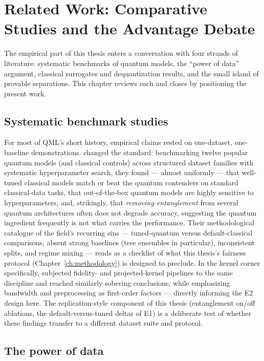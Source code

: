 \chapter{Related Work: Comparative Studies and the Advantage Debate}
\label{ch:related}

The empirical part of this thesis enters a conversation with four strands of
literature: systematic benchmarks of quantum models, the ``power of data''
argument, classical surrogates and dequantization results, and the small
island of provable separations. This chapter reviews each and closes by
positioning the present work.

\section{Systematic benchmark studies}
\label{sec:related-benchmarks}

For most of QML's short history, empirical claims rested on one-dataset,
one-baseline demonstrations. \citet{bowles2024better} changed the standard:
benchmarking twelve popular quantum models (and classical controls) across
structured dataset families with systematic hyperparameter search, they found
--- almost uniformly --- that well-tuned classical models match or beat the
quantum contenders on standard classical-data tasks, that out-of-the-box
quantum models are highly sensitive to hyperparameters, and, strikingly, that
\emph{removing entanglement} from several quantum architectures often does not
degrade accuracy, suggesting the quantum ingredient frequently is not what
carries the performance. Their methodological catalogue of the field's
recurring sins --- tuned-quantum versus default-classical comparisons, absent
strong baselines (tree ensembles in particular), inconsistent splits, and
regime mixing --- reads as a checklist of what this thesis's fairness protocol
(Chapter~\ref{ch:methodology}) is designed to preclude. In the kernel corner
specifically, \citet{schnabel2025scrutiny} subjected fidelity- and
projected-kernel pipelines to the same discipline and reached similarly
sobering conclusions, while emphasizing bandwidth and preprocessing as
first-order factors --- directly informing the E2 design here. The
replication-style component of this thesis (entanglement on/off ablations, the
default-versus-tuned deltas of E1) is a deliberate test of whether these
findings transfer to a different dataset suite and protocol.

\section{The power of data}
\label{sec:related-powerofdata}


